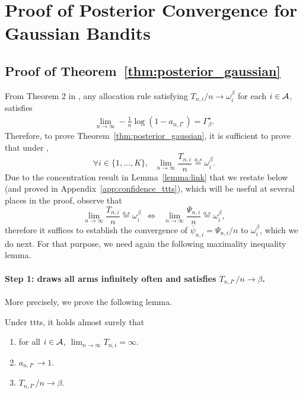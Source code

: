 \section{Proof of Posterior Convergence for Gaussian Bandits}\label{app:posterior_gaussian}

\subsection{Proof of Theorem~\ref{thm:posterior_gaussian}}\label{app:posterior_gaussian.main}

\restateposteriorgaussian*

From Theorem 2 in \cite{qin2017ttei}, any allocation rule satisfying $T_{n, i} / n \rightarrow \omega_i^\beta$ for each $i \in \mathcal{A}$, satisfies 
\begin{align*}
    \lim_{n \rightarrow \infty} - \frac{1}{n} \log(1 - a_{n,I^\star}) = \Gamma_{\beta}^\star.
\end{align*}
Therefore, to prove Theorem~\ref{thm:posterior_gaussian}, it is sufficient to prove that under \TTTS,
\begin{equation}
    \forall i \in \{1,\dots,K\}, \ \ \     \lim_{n\rightarrow\infty} \frac{T_{n,i}}{n}  \overset{a.s}{=} \omega_i^\beta\label{ToProveGaussian}.
\end{equation}
Due to the concentration result in Lemma~\ref{lemma:link} that we restate below (and proved in Appendix~\ref{app:confidence_ttts}), which will be useful at several places in the proof, observe that 
\[
    \lim_{n\rightarrow \infty} \frac{T_{n,i}}{n}  \overset{a.s}{=} \omega_i^\beta \ \ \Leftrightarrow \ \ \ \lim_{n\rightarrow \infty} \frac{\Psi_{n,i}}{n}  \overset{a.s}{=} \omega_i^\beta,
\]
therefore it suffices to establish the convergence of $\overline{\psi}_{n,i} = \Psi_{n,i}/n$ to $\omega_i^\beta$, which we do next. For that purpose, we need again the following maximality inequality lemma.

\restatewtwo*

\paragraph{Step 1: \TTTS draws all arms infinitely often and satisfies $T_{n,I^\star}/n \rightarrow \beta$.} More precisely, we prove the following lemma. 

\begin{lemma}\label{lemma:optimal_prop_istar_gaussian}
\begin{leftbar}[lemmabar]
	Under \gls{ttts}, it holds almost surely that
	\begin{enumerate}
	    \item for all $i \in \mathcal{A}$, $\lim_{n\rightarrow \infty} T_{n,i} = \infty.$
	    \item $a_{n,I^\star} \rightarrow 1.$
	    \item $T_{n,I^\star}/n \rightarrow \beta$.
	\end{enumerate}
\end{leftbar}
\end{lemma}

